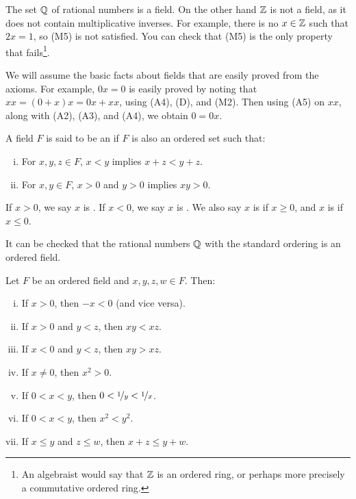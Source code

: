 \begin{example}
The set ${\mathbb{Q}}$ of rational numbers is a field.  On the other hand ${\mathbb{Z}}$ is not a
field, as it does not contain multiplicative inverses.  For example,
there is no $x \in {\mathbb{Z}}$ such that $2x = 1$, so (M5) is not satisfied.  You
can check that (M5) is the only property that fails\footnote{An algebraist would say that ${\mathbb{Z}}$ is an ordered
ring, or perhaps more precisely a commutative ordered ring.}.
\end{example}

We will assume the basic facts about fields that are easily 
proved from the axioms.  For example, $0x = 0$ is easily proved
by noting that $xx = (0+x)x = 0x+xx$, using (A4), (D)\@, and (M2).  Then
using (A5) on $xx$, along with (A2), (A3), and (A4), we obtain $0 = 0x$.

\begin{defn}
A field $F$ is said to be an \emph{} if
$F$ is also an ordered set such that:
\begin{enumerate}[(i)]
\item \label{defn:ordfield:i} For $x,y,z \in F$,  $x < y$ implies $x+z <
y+z$.
\item \label{defn:ordfield:ii} For $x,y \in F$, $x > 0$ and $y > 0$
implies $xy > 0$.
\end{enumerate}
If $x > 0$, we say $x$ is \emph{}.
If $x < 0$, we say $x$ is \emph{}.
We also say $x$ is \emph{} if $x \geq 0$,
and $x$ is \emph{} if $x \leq 0$.
\end{defn}

It can be checked that the rational numbers ${\mathbb{Q}}$ with the
standard ordering is an ordered field.

\begin{prop} \label{prop:bordfield}
Let $F$ be an ordered field and $x,y,z,w \in F$.  Then:
\begin{enumerate}[(i)]
\item \label{prop:bordfield:i} If $x > 0$, then $-x < 0$ (and vice versa).
\item \label{prop:bordfield:ii} If $x > 0$ and $y < z$, then $xy < xz$.
\item \label{prop:bordfield:iii} If $x < 0$ and $y < z$, then $xy > xz$.
\item \label{prop:bordfield:iv} If $x \not= 0$, then $x^2 > 0$.
\item \label{prop:bordfield:v} If $0 < x < y$, then $0 < \nicefrac{1}{y} < \nicefrac{1}{x}$.
\item \label{prop:bordfield:vi} If $0 < x < y$, then $x^2 < y^2$.
\item \label{prop:bordfield:vii} If $x \leq y$ and $z \leq w$, then $x + z \leq y + w$.
\end{enumerate}
\end{prop}

